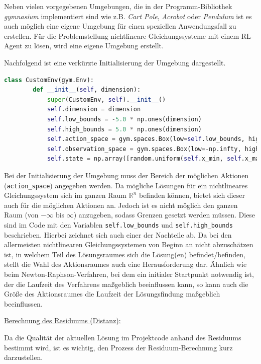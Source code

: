 \documentclass{article}
\def\code#1{\texttt{#1}}
\theoremstyle{newline}
\begin{document}
\begin{onehalfspace}
Neben vielen vorgegebenen Umgebungen, die in der Programm-Bibliothek \textit{gymnasium} implementiert sind wie z.B. \textit{Cart Pole}, \textit{Acrobot} oder \textit{Pendulum} ist es auch möglich eine eigene Umgebung für einen speziellen Anwendungsfall zu erstellen. Für die Problemstellung nichtlineare Gleichungssysteme mit einem RL-Agent zu lösen, wird eine eigene Umgebung erstellt. 

Nachfolgend ist eine verkürzte Initialisierung der Umgebung dargestellt.

\begin{lstlisting}[language=Python, caption={Initialisierung der Umgebung}, label={lst:python}]
	class CustomEnv(gym.Env):
		def __init__(self, dimension):
			super(CustomEnv, self).__init__()
			self.dimension = dimension
			self.low_bounds = -5.0 * np.ones(dimension)
			self.high_bounds = 5.0 * np.ones(dimension)
			self.action_space = gym.spaces.Box(low=self.low_bounds, high=self.high_bounds, dtype=np.float64)
			self.observation_space = gym.spaces.Box(low=-np.infty, high=np.infty, shape=(dimension,))
			self.state = np.array([random.uniform(self.x_min, self.x_max), random.uniform(self.y_min, self.y_max)] + [0.0] * dimension)	
\end{lstlisting}

Bei der Initialisierung der Umgebung muss der Bereich der möglichen Aktionen (\code{action\_space}) angegeben werden. Da mögliche Lösungen für ein nichtlineares Gleichungssystem sich im ganzen Raum $\mathbb{R}^n$ befinden können, bietet sich dieser auch für die möglichen Aktionen an. Jedoch ist es nicht möglich den ganzen Raum (von $-\infty$ bis $\infty$) anzugeben, sodass Grenzen gesetzt werden müssen. Diese sind im Code mit den Variablen \code{self.low\_bounds} und \code{self.high\_bounds} beschrieben. Hierbei zeichnet sich auch einer der Nachteile ab. Da bei den allermeisten nichtlinearen Gleichungssystemen von Beginn an nicht abzuschätzen ist, in welchem Teil des Lösungsraumes sich die Lösung(en) befindet/befinden, stellt die Wahl des Aktionsraumes auch eine Herausforderung dar. Ähnlich wie beim Newton-Raphson-Verfahren, bei dem ein initialer Startpunkt notwendig ist, der die Laufzeit des Verfahrens maßgeblich beeinflussen kann, so kann auch die Größe des Aktionsraumes die Laufzeit der Lösungsfindung maßgeblich beeinflussen.
\bigskip

\underline{Berechnung des Residuums (Distanz):}
\smallskip

Da die Qualität der aktuellen Lösung im Projektcode anhand des Residuums bestimmt wird, ist es wichtig, den Prozess der Residuum-Berechnung kurz darzustellen.
\medskip


\end{onehalfspace}
\end{document}
